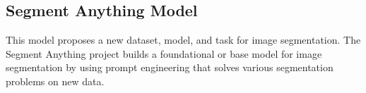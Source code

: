 \subsection{Segment Anything Model}

\noindent This model proposes a new dataset, model, and task for image segmentation.
The Segment Anything project builds a foundational or base model for image segmentation by using prompt engineering that solves various segmentation problems on new data.



